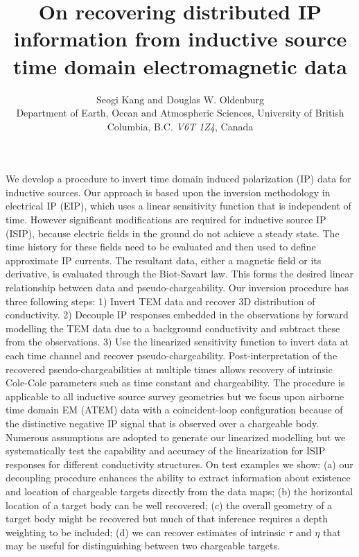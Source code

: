 \documentclass[extra,mreferee]{gji}
\author[Seogi Kang and Douglas W. Oldenburg]
   {Seogi Kang and Douglas W. Oldenburg \\
    Department of Earth, Ocean and Atmospheric Sciences,
    University of British Columbia,
    B.C. \emph{V6T 1Z4}, Canada
  }
\title{On recovering distributed IP information from inductive source time domain electromagnetic data}
\begin{document}
\label{firstpage}

\maketitle

\begin{summary}
We develop a procedure to invert time domain induced polarization (IP) data for inductive sources. Our approach is based upon the inversion methodology in electrical IP (EIP), which uses a linear sensitivity function that is independent of time. However  significant modifications are required for inductive source IP (ISIP), because electric fields in the ground do not achieve a steady state. The time history for these fields need to be evaluated and then used to define approximate IP currents. The resultant data, either a magnetic field or its derivative, is evaluated through the Biot-Savart law. This forms the desired linear relationship between data and pseudo-chargeability.
Our inversion procedure has three following steps:
1) Invert TEM data and recover 3D distribution of conductivity.
2) Decouple IP responses embedded in the observations by  forward modelling the TEM data due to a background conductivity and subtract these from the observations. 3) Use the linearized sensitivity function to invert data at each  time channel and recover pseudo-chargeability. Post-interpretation of the recovered pseudo-chargeabilities at multiple times allows recovery of intrinsic Cole-Cole parameters such as time constant and chargeability. The procedure is applicable to all inductive source survey geometries but we focus upon airborne time domain EM (ATEM) data with a coincident-loop configuration because of the distinctive negative IP signal that is observed over a chargeable body. 
Numerous assumptions are adopted to generate our linearized modelling but we systematically test the capability and accuracy of the linearization for ISIP responses for different conductivity structures. On test examples we show: (a) our decoupling procedure enhances the ability to extract information about existence and location of chargeable targets directly from the data maps; (b) the horizontal location of a target body can be well recovered; (c) the overall geometry of a target body might be recovered but much of that inference requires a depth weighting to be included; (d)  we can recover estimates of intrinsic $\tau$ and $\eta$ that may be useful for distinguishing between two chargeable targets. 
\end{summary}
\end{document}
